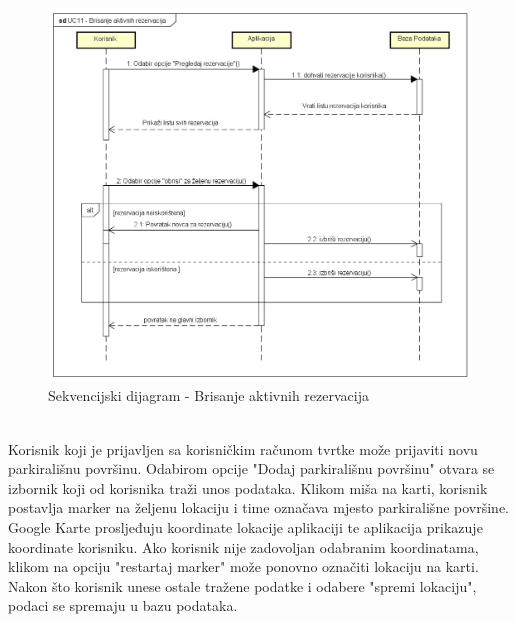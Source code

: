 				\begin{figure}[H]
					\includegraphics[scale=0.5]{dijagrami/Sekvencijski dijagram -brisanje aktivnih rezervacija.png} %
					\centering
					\caption{Sekvencijski dijagram - Brisanje aktivnih rezervacija}
					\label{fig:promjene}
				\end{figure}	
			
				\newpage
			\\
			Korisnik koji je prijavljen sa korisničkim računom tvrtke može prijaviti novu parkirališnu površinu. Odabirom opcije "Dodaj parkirališnu površinu" otvara se izbornik koji od korisnika traži unos podataka. Klikom miša na karti, korisnik postavlja marker na željenu lokaciju i time označava mjesto parkirališne površine. Google Karte prosljeđuju koordinate lokacije aplikaciji te aplikacija prikazuje koordinate korisniku. Ako korisnik nije zadovoljan odabranim koordinatama, klikom na opciju "restartaj marker" može ponovno označiti lokaciju na karti. Nakon što korisnik unese ostale tražene podatke i odabere "spremi lokaciju", podaci se spremaju u bazu podataka.
			
